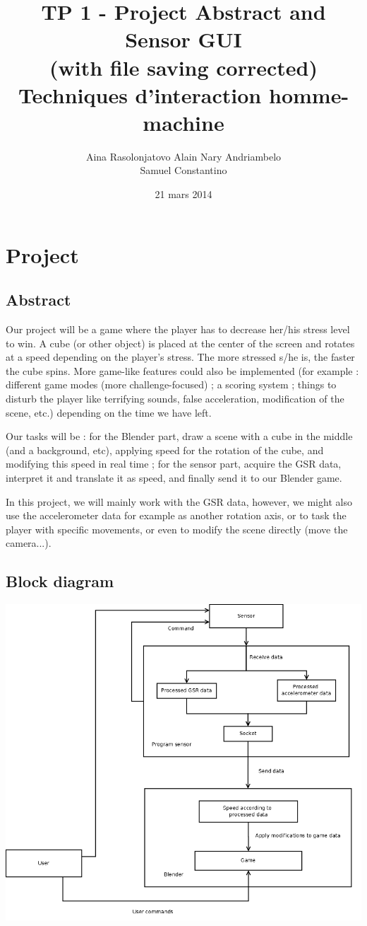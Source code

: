 \documentclass[12pt,a4paper]{article}
\title{\LARGE \textbf{TP 1 - Project Abstract and Sensor GUI \\ (with file saving corrected)}\\
	\bigskip
	\bigskip
	\large Techniques d'interaction homme-machine}
\author{Aina Rasolonjatovo Alain Nary Andriambelo \\ Samuel Constantino}
\date{21 mars 2014}
\begin{document}
	\maketitle


\section{Project}

\subsection{Abstract}

Our project will be a game where the player has to decrease her/his stress level to win. A cube (or other object) is placed at the center of the screen and rotates at a speed depending on the player's stress. The more stressed s/he is, the faster the cube spins. More game-like features could also be implemented (for example : different game modes (more challenge-focused) ; a scoring system ; things to disturb the player like terrifying sounds, false acceleration, modification of the scene, etc.) depending on the time we have left.

Our tasks will be : for the Blender part, draw a scene with a cube in the middle (and a background, etc), applying speed for the rotation of the cube, and modifying this speed in real time ; for the sensor part, acquire the GSR data, interpret it and translate it as speed, and finally send it to our Blender game. 

In this project, we will mainly work with the GSR data, however, we might also use the accelerometer data for example as another rotation axis, or to task the player with specific movements, or even to modify the scene directly (move the camera...).

\subsection{Block diagram}

\includegraphics[width=\textwidth,height=\textheight,keepaspectratio]{graph/blockDiagram.png}
\end{document}
